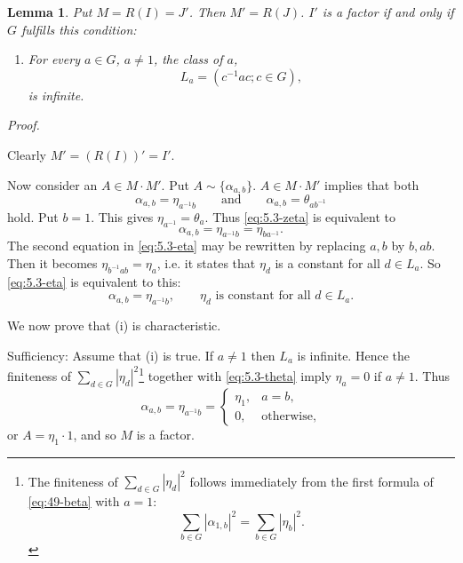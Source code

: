 \documentclass[b5paper,twoside]{article}
\theoremstyle{mvnplain}
\newtheorem{lemma}{Lemma}[section]
\renewenvironment{proof}[1][Proof]{%
  \par\addvspace{0.35\baselineskip}%
  \noindent\textit{#1.}\ \normalfont\ignorespaces
}{%
  \par\addvspace{0.35\baselineskip}%
}
\newcommand{\M}{\mathbf M}
\newcommand{\R}{\mathbf R}
\def\M{M}%
\def\R{R}%
\def\mathfrak#1{#1}%
\begin{document}
\begin{lemma}\label{lem:5.3.4}
Put \(\M=\R(I)=J'\). Then \(\M'=\R(J)\). \(I'\) is a factor if and only if
\(\mathfrak G\) fulfills this condition:
\begin{enumerate}[label=(\roman*)]
\item For every \(a\in\mathfrak G\), \(a\ne1\), the class of \(a\),
\[
 \mathfrak L_a=(c^{-1}ac;c\in\mathfrak G),
\]
is infinite.
\end{enumerate}
\end{lemma}

\begin{proof}
Clearly \(\M'=(\R(I))'=I'\).

Now consider an \(A\in\M\cdot\M'\). Put
\(A\sim\{\alpha_{a,b}\}\). \(A\in\M\cdot\M'\) implies that both
\begin{equation}\tag{5.3.\(\zeta\)}\label{eq:5.3-zeta}
 \alpha_{a,b}=\eta_{a^{-1}b}
 \qquad\text{and}\qquad
 \alpha_{a,b}=\theta_{ab^{-1}}
\end{equation}
hold. Put \(b=1\). This gives \(\eta_{a^{-1}}=\theta_a\). Thus
\eqref{eq:5.3-zeta} is equivalent to
\begin{equation}\tag{5.3.\(\eta\)}\label{eq:5.3-eta}
 \alpha_{a,b}=\eta_{a^{-1}b}=\eta_{ba^{-1}}.
\end{equation}
The second equation in \eqref{eq:5.3-eta} may be rewritten by replacing
\(a,b\) by \(b,ab\). Then it becomes \(\eta_{b^{-1}ab}=\eta_a\), i.e. it
states that \(\eta_d\) is a constant for all \(d\in\mathfrak L_a\). So
\eqref{eq:5.3-eta} is equivalent to this:
\begin{equation}\tag{5.3.\(\theta\)}\label{eq:5.3-theta}
 \alpha_{a,b}=\eta_{a^{-1}b},\qquad
 \eta_d\text{ is constant for all }d\in\mathfrak L_a.
\end{equation}

We now prove that (i) is characteristic.

Sufficiency: Assume that (i) is true. If \(a\ne1\) then
\(\mathfrak L_a\) is infinite. Hence the finiteness of
\(\sum_{d\in\mathfrak G}|\eta_d|^2\)\footnote{The finiteness of
\(\sum_{d\in\mathfrak G}|\eta_d|^2\) follows immediately from the first
formula of \eqref{eq:49-beta} with \(a=1\):
\[
 \sum_{b\in\mathfrak G}|\alpha_{1,b}|^2
 =\sum_{b\in\mathfrak G}|\eta_b|^2.
\]} together with \eqref{eq:5.3-theta} imply \(\eta_a=0\) if \(a\ne1\).
Thus
\[
 \alpha_{a,b}=\eta_{a^{-1}b}
 =\begin{cases}\eta_1,&a=b,\\0,&\text{otherwise},\end{cases}
\]
or \(A=\eta_1\cdot1\), and so \(\M\) is a factor.


\end{proof}
\end{document}
